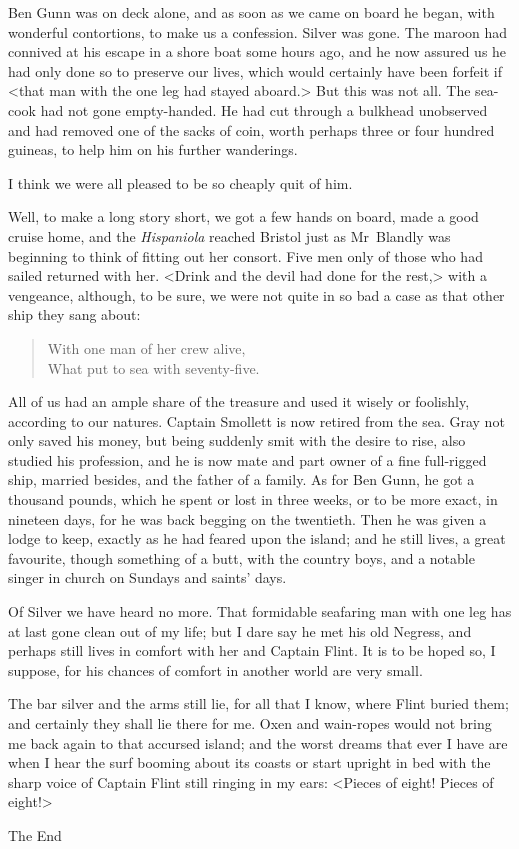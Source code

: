Ben Gunn was on deck alone, and as soon as we came on board he began, with wonderful contortions, to make us a confession. Silver was gone. The maroon had connived at his escape in a shore boat some hours ago, and he now assured us he had only done so to preserve our lives, which would certainly have been forfeit if <that man with the one leg had stayed aboard.> But this was not all. The sea-cook had not gone empty-handed. He had cut through a bulkhead unobserved and had removed one of the sacks of coin, worth perhaps three or four hundred guineas, to help him on his further wanderings.

I think we were all pleased to be so cheaply quit of him.

Well, to make a long story short, we got a few hands on board, made a good cruise home, and the \textit{Hispaniola} reached Bristol just as Mr~Blandly was beginning to think of fitting out her consort. Five men only of those who had sailed returned with her. <Drink and the devil had done for the rest,> with a vengeance, although, to be sure, we were not quite in so bad a case as that other ship they sang about:

\blockquote{
With one man of her crew alive,\\
What put to sea with seventy-five.
}

All of us had an ample share of the treasure and used it wisely or foolishly, according to our natures. Captain Smollett is now retired from the sea. Gray not only saved his money, but being suddenly smit with the desire to rise, also studied his profession, and he is now mate and part owner of a fine full-rigged ship, married besides, and the father of a family. As for Ben Gunn, he got a thousand pounds, which he spent or lost in three weeks, or to be more exact, in nineteen days, for he was back begging on the twentieth. Then he was given a lodge to keep, exactly as he had feared upon the island; and he still lives, a great favourite, though something of a butt, with the country boys, and a notable singer in church on Sundays and saints' days.

Of Silver we have heard no more. That formidable seafaring man with one leg has at last gone clean out of my life; but I dare say he met his old Negress, and perhaps still lives in comfort with her and Captain Flint. It is to be hoped so, I suppose, for his chances of comfort in another world are very small.

The bar silver and the arms still lie, for all that I know, where Flint buried them; and certainly they shall lie there for me. Oxen and wain-ropes would not bring me back again to that accursed island; and the worst dreams that ever I have are when I hear the surf booming about its coasts or start upright in bed with the sharp voice of Captain Flint still ringing in my ears: <Pieces of eight! Pieces of eight!>
\vfill
\begin{center}
{\Huge\chapterfont The End}
\end{center}
